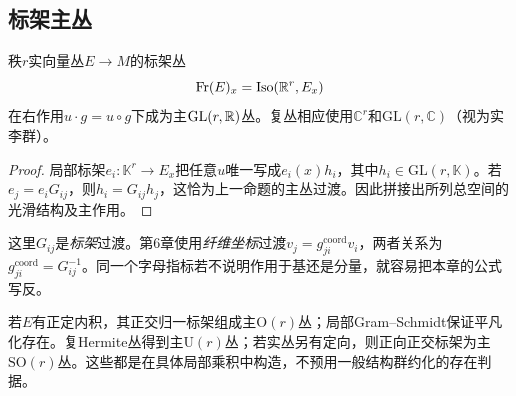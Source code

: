 \subsection{标架主丛}
\begin{proposition}\label{prop:principal-frames}
秩$r$实向量丛$E\to M$的标架丛
\[
 \operatorname{Fr}(E)_x=\operatorname{Iso}(\mathbb{R}^r,E_x)
\]
在右作用$u\cdot g=u\circ g$下成为主$\mathrm{GL}(r,\mathbb{R})$丛。复丛相应使用$\mathbb C^r$和$\mathrm{GL}(r,\mathbb C)$（视为实李群）。
\end{proposition}
\begin{proof}
局部标架$e_i:\mathbb K^r\to E_x$把任意$u$唯一写成$e_i(x)h_i$，其中$h_i\in\mathrm{GL}(r,\mathbb K)$。若$e_j=e_iG_{ij}$，则$h_i=G_{ij}h_j$，这恰为上一命题的主丛过渡。因此拼接出所列总空间的光滑结构及主作用。
\end{proof}
这里$G_{ij}$是\emph{标架}过渡。第6章使用\emph{纤维坐标}过渡$v_j=g_{ji}^{\mathrm{coord}}v_i$，两者关系为$g_{ji}^{\mathrm{coord}}=G_{ij}^{-1}$。同一个字母指标若不说明作用于基还是分量，就容易把本章的公式写反。

若$E$有正定内积，其正交归一标架组成主$\mathrm O(r)$丛；局部Gram--Schmidt保证平凡化存在。复Hermite丛得到主$\mathrm U(r)$丛；若实丛另有定向，则正向正交标架为主$\mathrm{SO}(r)$丛。这些都是在具体局部乘积中构造，不预用一般结构群约化的存在判据。
